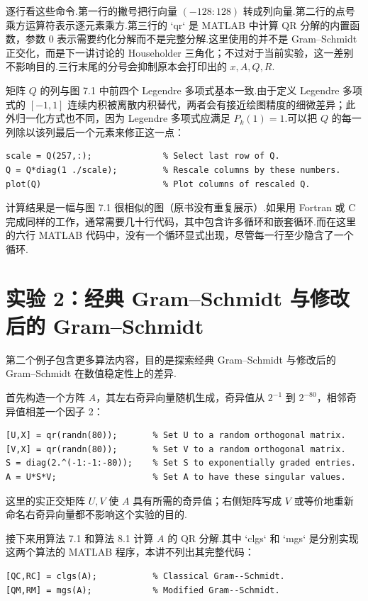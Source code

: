 \documentclass[UTF8,fontset=none,12pt]{ctexart}
\begin{document}
逐行看这些命令.第一行的撇号把行向量 $(-128:128)$ 转成列向量.第二行的点号乘方运算符表示逐元素乘方.第三行的 `qr` 是 MATLAB 中计算 QR 分解的内置函数，参数 0 表示需要约化分解而不是完整分解.这里使用的并不是 Gram--Schmidt 正交化，而是下一讲讨论的 Householder 三角化；不过对于当前实验，这一差别不影响目的.三行末尾的分号会抑制原本会打印出的 $x,A,Q,R$.

矩阵 $Q$ 的列与图 7.1 中前四个 Legendre 多项式基本一致.由于定义 Legendre 多项式的 $[-1,1]$ 连续内积被离散内积替代，两者会有接近绘图精度的细微差异；此外归一化方式也不同，因为 Legendre 多项式应满足 $P_k(1)=1$.可以把 $Q$ 的每一列除以该列最后一个元素来修正这一点：

\begin{verbatim}
scale = Q(257,:);              % Select last row of Q.
Q = Q*diag(1 ./scale);         % Rescale columns by these numbers.
plot(Q)                        % Plot columns of rescaled Q.
\end{verbatim}

计算结果是一幅与图 7.1 很相似的图（原书没有重复展示）.如果用 Fortran 或 C 完成同样的工作，通常需要几十行代码，其中包含许多循环和嵌套循环.而在这里的六行 MATLAB 代码中，没有一个循环显式出现，尽管每一行至少隐含了一个循环.

\section*{实验 2：经典 Gram--Schmidt 与修改后的 Gram--Schmidt}

第二个例子包含更多算法内容，目的是探索经典 Gram--Schmidt 与修改后的 Gram--Schmidt 在数值稳定性上的差异.

首先构造一个方阵 $A$，其左右奇异向量随机生成，奇异值从 $2^{-1}$ 到 $2^{-80}$，相邻奇异值相差一个因子 2：

\begin{verbatim}
[U,X] = qr(randn(80));       % Set U to a random orthogonal matrix.
[V,X] = qr(randn(80));       % Set V to a random orthogonal matrix.
S = diag(2.^(-1:-1:-80));    % Set S to exponentially graded entries.
A = U*S*V;                   % Set A to have these singular values.
\end{verbatim}

这里的实正交矩阵 $U,V$ 使 $A$ 具有所需的奇异值；右侧矩阵写成 $V$ 或等价地重新命名右奇异向量都不影响这个实验的目的.

接下来用算法 7.1 和算法 8.1 计算 $A$ 的 QR 分解.其中 `clgs` 和 `mgs` 是分别实现这两个算法的 MATLAB 程序，本讲不列出其完整代码：

\begin{verbatim}
[QC,RC] = clgs(A);           % Classical Gram--Schmidt.
[QM,RM] = mgs(A);            % Modified Gram--Schmidt.
\end{verbatim}
\end{document}
